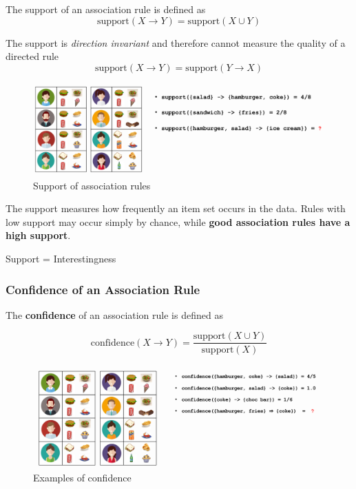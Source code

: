 \documentclass[a4paper, 11pt]{article}
\begin{document}
The support of an association rule is defined as
\begin{equation*}
	\text{support}(X\rightarrow Y) = \text{support}(X\cup Y)
\end{equation*}

The support is \emph{direction invariant} and therefore cannot measure the quality of a directed rule
\begin{equation*}
	\text{support}(X\rightarrow Y) = \text{support}(Y\rightarrow X)
\end{equation*}

\begin{figure}[tbh!]
	\centering
	\includegraphics[width=0.7\linewidth, keepaspectratio]{Pictures/support_association_rule}
	\caption{Support of association rules}
	\label{fig:supportassociationrule}
\end{figure}

The support measures how frequently an item set occurs in the data. Rules with low support may occur simply by chance, while \textbf{good association rules have a high support}.

\begin{theorem}
	Support = Interestingness
\end{theorem}

\subsubsection{Confidence of an Association Rule}

The \textbf{confidence} of an association rule is defined as

\begin{equation*}
	\text{confidence}(X\rightarrow Y) = \frac{\text{support}(X\cup Y)}{\text{support}(X)}
\end{equation*}

\begin{figure}[tbh!]
	\centering
	\includegraphics[width=0.7\linewidth, keepaspectratio]{Pictures/confidence_association_rule}
	\caption{Examples of confidence}
	\label{fig:confidenceassociationrule}
\end{figure}
\end{document}
